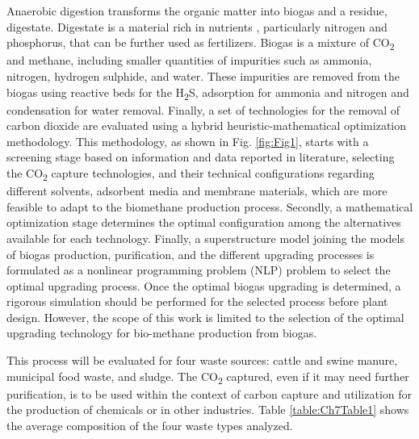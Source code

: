 \begin{refsection}[referencesCh7]
Anaerobic digestion transforms the organic matter into biogas and a residue, digestate. Digestate is a material rich in nutrients \citet{leon2016optimal}, particularly nitrogen and phosphorus, that can be further used as fertilizers. Biogas is a mixture of CO\textsubscript{2} and methane, including smaller quantities of impurities such as ammonia, nitrogen, hydrogen sulphide, and water. These impurities are removed from the biogas using reactive beds for the H\textsubscript{2}S, adsorption for ammonia and nitrogen and condensation for water removal. Finally, a set of technologies for the removal of carbon dioxide are evaluated using a hybrid heuristic-mathematical optimization methodology. This methodology, as shown in Fig. \ref{fig:Fig1}, starts with a screening stage based on information and data reported in literature, selecting the CO\textsubscript{2} capture technologies, and their technical configurations regarding different solvents, adsorbent media and membrane materials, which are more feasible to adapt to the biomethane production process. Secondly, a mathematical optimization stage determines the optimal configuration among the alternatives available for each technology. Finally, a superstructure model joining the models of biogas production, purification, and the different upgrading processes is formulated as a nonlinear programming problem (NLP) problem \citet{trespalacios2014review} to select the optimal upgrading process. Once the optimal biogas upgrading is determined, a rigorous simulation should be performed for the selected process before plant design. However, the scope of this work is limited to the selection of the optimal upgrading technology for bio-methane production from biogas.

This process will be evaluated for four waste sources: cattle and swine manure, municipal food waste, and sludge. The CO\textsubscript{2} captured, even if it may need further purification, is to be used within the context of carbon capture and utilization for the production of chemicals or in other industries. Table \ref{table:Ch7Table1} shows the average composition of the four waste types analyzed.


\end{refsection}
